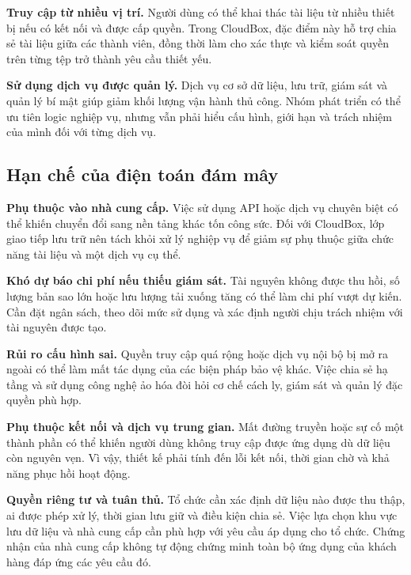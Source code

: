 \textbf{Truy cập từ nhiều vị trí.} Người dùng có thể khai thác tài liệu từ nhiều thiết bị nếu có kết nối và được cấp quyền. Trong CloudBox, đặc điểm này hỗ trợ chia sẻ tài liệu giữa các thành viên, đồng thời làm cho xác thực và kiểm soát quyền trên từng tệp trở thành yêu cầu thiết yếu.

\textbf{Sử dụng dịch vụ được quản lý.} Dịch vụ cơ sở dữ liệu, lưu trữ, giám sát và quản lý bí mật giúp giảm khối lượng vận hành thủ công. Nhóm phát triển có thể ưu tiên logic nghiệp vụ, nhưng vẫn phải hiểu cấu hình, giới hạn và trách nhiệm của mình đối với từng dịch vụ.

\subsection{Hạn chế của điện toán đám mây}
\textbf{Phụ thuộc vào nhà cung cấp.} Việc sử dụng API hoặc dịch vụ chuyên biệt có thể khiến chuyển đổi sang nền tảng khác tốn công sức. Đối với CloudBox, lớp giao tiếp lưu trữ nên tách khỏi xử lý nghiệp vụ để giảm sự phụ thuộc giữa chức năng tài liệu và một dịch vụ cụ thể.

\textbf{Khó dự báo chi phí nếu thiếu giám sát.} Tài nguyên không được thu hồi, số lượng bản sao lớn hoặc lưu lượng tải xuống tăng có thể làm chi phí vượt dự kiến. Cần đặt ngân sách, theo dõi mức sử dụng và xác định người chịu trách nhiệm với tài nguyên được tạo.

\textbf{Rủi ro cấu hình sai.} Quyền truy cập quá rộng hoặc dịch vụ nội bộ bị mở ra ngoài có thể làm mất tác dụng của các biện pháp bảo vệ khác. Việc chia sẻ hạ tầng và sử dụng công nghệ ảo hóa đòi hỏi cơ chế cách ly, giám sát và quản lý đặc quyền phù hợp.\cite{ccsp}

\textbf{Phụ thuộc kết nối và dịch vụ trung gian.} Mất đường truyền hoặc sự cố một thành phần có thể khiến người dùng không truy cập được ứng dụng dù dữ liệu còn nguyên vẹn. Vì vậy, thiết kế phải tính đến lỗi kết nối, thời gian chờ và khả năng phục hồi hoạt động.

\textbf{Quyền riêng tư và tuân thủ.} Tổ chức cần xác định dữ liệu nào được thu thập, ai được phép xử lý, thời gian lưu giữ và điều kiện chia sẻ. Việc lựa chọn khu vực lưu dữ liệu và nhà cung cấp cần phù hợp với yêu cầu áp dụng cho tổ chức. Chứng nhận của nhà cung cấp không tự động chứng minh toàn bộ ứng dụng của khách hàng đáp ứng các yêu cầu đó.

